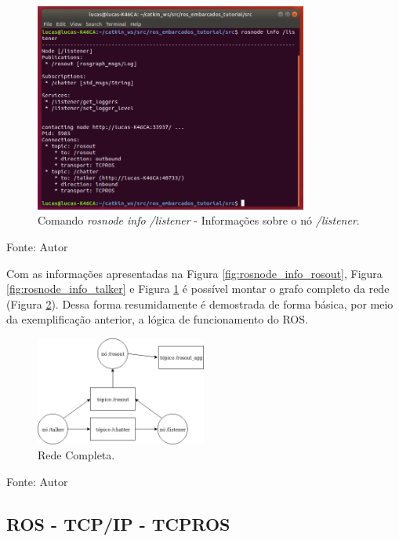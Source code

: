 \begin{figure}[!htb]
  \centering
  \caption{Comando \textit{rosnode info /listener} - Informações sobre o nó \textit{/listener}.}
  \label{fig:rosnode_info_listener}
  \includegraphics[width=0.8\textwidth]{./img/fundamentacao/rosnode_info_listener.png}
\end{figure}
Fonte: Autor

Com as informações apresentadas na Figura \ref{fig:rosnode_info_rosout}, Figura \ref{fig:rosnode_info_talker} e Figura \ref{fig:rosnode_info_listener} é possível montar o grafo completo da rede (Figura \ref{fig:rosnet_listener_talker}).
Dessa forma resumidamente é demostrada de forma básica, por meio da exemplificação anterior, a lógica de funcionamento do ROS.

\begin{figure}[!htb]
  \centering
  \caption{Rede Completa.}
  \label{fig:rosnet_listener_talker}
  \includegraphics[width=0.50\textwidth]{./img/fundamentacao/rosnet_listener_talker.png}
\end{figure}
Fonte: Autor

\pagebreak

\subsection{ROS - TCP/IP - TCPROS}

